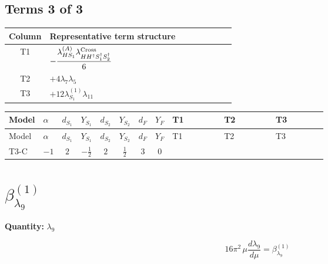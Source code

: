 \documentclass[8pt]{article}
\begin{document}
\begin{landscape}
\subsection*{Terms 3 of 3}
\begin{center}
\begin{tabular}{@{}c >{\raggedright\arraybackslash}p{0.82\linewidth}@{}}
\toprule
Column & Representative term structure \\
\midrule
T1 & \(\displaystyle -\frac{{\lambda_{HS_1}^{(A)}} {\lambda_{H H^\dagger S_1^\dagger S_2^\dagger}^{\rm Cross}}}{6}\) \\
\midrule
T2 & \(\displaystyle +4 {\lambda_{7}} {\lambda_5}\) \\
\midrule
T3 & \(\displaystyle +12 {\lambda_{S_1}^{(1)}} {\lambda_{11}}\) \\
\midrule
\bottomrule
\end{tabular}
\end{center}
\smallskip
\tiny
\begin{longtable}{@{}llcccccc >{\raggedright\arraybackslash}p{0.21\linewidth} >{\raggedright\arraybackslash}p{0.21\linewidth} >{\raggedright\arraybackslash}p{0.21\linewidth}@{}}
\toprule
Model & $\alpha$ & $d_{S_1}$ & $Y_{S_1}$ & $d_{S_2}$ & $Y_{S_2}$ & $d_F$ & $Y_F$ & T1 & T2 & T3 \\
\midrule
\endfirsthead
\toprule
Model & $\alpha$ & $d_{S_1}$ & $Y_{S_1}$ & $d_{S_2}$ & $Y_{S_2}$ & $d_F$ & $Y_F$ & T1 & T2 & T3 \\
\midrule
\endhead
T3-C & $-1$ & $2$ & $-\frac{1}{2}$ & $2$ & $\frac{1}{2}$ & $3$ & $0$ & \scriptsize\adjustbox{max width=\linewidth}{$\begin{gathered} -\frac{{\lambda_{HS_1}^{(A)}} {\lambda_{H H^\dagger S_1^\dagger S_2^\dagger}^{\rm Cross}}}{6}\end{gathered}$} & \scriptsize\adjustbox{max width=\linewidth}{$\begin{gathered} +4 {\lambda_{7}} {\lambda_5}\end{gathered}$} & \scriptsize\adjustbox{max width=\linewidth}{$\begin{gathered} +12 {\lambda_{S_1}^{(1)}} {\lambda_{11}}\end{gathered}$} \\
\midrule
\bottomrule
\end{longtable}
\clearpage
\section*{$\beta_{\lambda_{9}}^{(1)}$}
\noindent\textbf{Quantity: }$\lambda_{9}$\par\smallskip
\[16\pi^2\,\mu\frac{d \lambda_{9}}{d\mu}=\beta_{\lambda_{9}}^{(1)}\]

\end{landscape}
\end{document}
